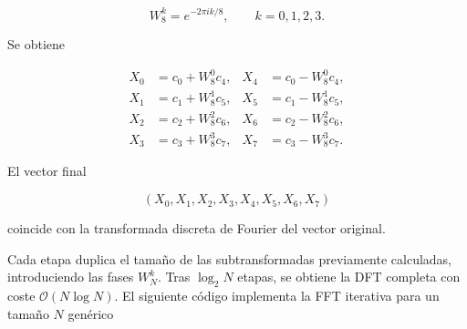 \documentclass[11pt,a4paper,twoside,pdf]{article}
\numberwithin{equation}{section}
\begin{document}
\[
W_8^k = e^{-2\pi i k/8}, \qquad k=0,1,2,3.
\]

Se obtiene

\[
\begin{aligned}
X_0 &= c_0 + W_8^0 c_4, &
X_4 &= c_0 - W_8^0 c_4,\\
X_1 &= c_1 + W_8^1 c_5, &
X_5 &= c_1 - W_8^1 c_5,\\
X_2 &= c_2 + W_8^2 c_6, &
X_6 &= c_2 - W_8^2 c_6,\\
X_3 &= c_3 + W_8^3 c_7, &
X_7 &= c_3 - W_8^3 c_7.
\end{aligned}
\]

El vector final

\[
(X_0,X_1,X_2,X_3,X_4,X_5,X_6,X_7)
\]

coincide con la transformada discreta de Fourier del vector original.


Cada etapa duplica el tamaño de las subtransformadas previamente calculadas, introduciendo las fases $W_N^k$. Tras $\log_2 N$ etapas, se obtiene la DFT completa con coste $\mathcal{O}(N\log N)$. El siguiente código implementa la FFT iterativa para un tamaño $N$ genérico\\
\end{document}
